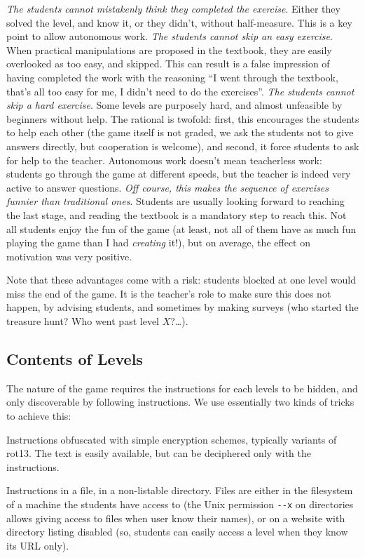 \documentclass{sig-alternate}
\begin{document}
\textit{The students cannot mistakenly think they completed the
  exercise}. Either they solved the level, and know it, or they didn't,
  without half-measure. This is a key point to allow autonomous work.
\textit{The students cannot skip an easy exercise}. When practical
  manipulations are proposed in the textbook, they are easily
  overlooked as too easy, and skipped. This can result
  is a false impression of having completed the work with the
  reasoning ``I went through the textbook, that's all too easy for me,
  I didn't need to do the exercises''.
\textit{The students cannot skip a hard exercise}. Some levels are
  purposely hard, and almost unfeasible by
  beginners without help. The rational is twofold: first, this
  encourages the students to help each other (the game itself is not
  graded, we ask the students not to give answers directly, but
  cooperation is welcome), and second, it force students to ask for
  help to the teacher. Autonomous work doesn't mean teacherless work:
  students go through the game at different speeds, but the teacher is
  indeed very active to answer questions.
\textit{Off course, this makes the sequence of exercises funnier than
  traditional ones}. Students are usually looking forward to reaching
  the last stage, and reading the textbook is a mandatory step to reach
  this. Not all students enjoy the fun of the game (at least, not all
  of them have as much fun playing the game than I had \emph{creating}
  it!), but on average, the effect on motivation was very positive.

Note that these advantages come with a risk: students blocked at one
level would miss the end of the game. It is the teacher's role to make
sure this does not happen, by advising students, and sometimes by
making surveys (who started the treasure hunt? Who went past level
$X$?\dots).

\subsection{Contents of Levels}

The nature of the game requires the instructions for each levels to be
hidden, and only discoverable by following instructions. We use
essentially two kinds of tricks to achieve this:

\begin{compactitem}
\item Instructions obfuscated with simple encryption schemes,
  typically variants of rot13. The text is easily
  available, but can be deciphered only with the
  instructions.
\item Instructions in a file, in a non-listable directory. Files are
  either in the filesystem of a machine the students have access to
  (the Unix permission \verb|--x| on directories allows giving access
  to files when user know their names), or on a website with directory
  listing disabled (so, students can easily access a level when they
  know its URL only).
\end{compactitem}
\end{document}

